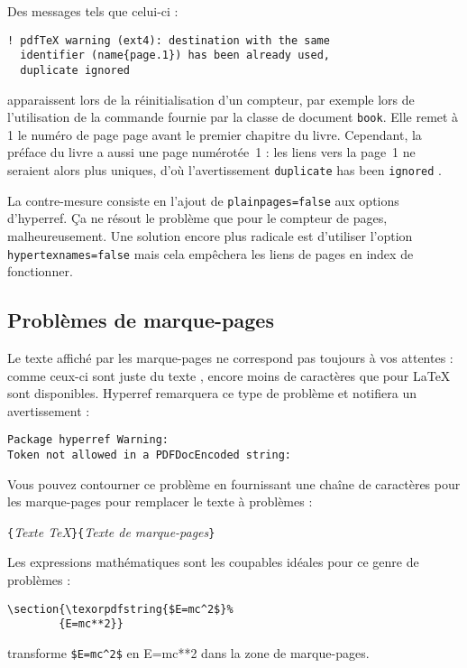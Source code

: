 Des messages tels que celui-ci :
\begin{verbatim}
! pdfTeX warning (ext4): destination with the same
  identifier (name{page.1}) has been already used,
  duplicate ignored
\end{verbatim}
apparaissent lors de la réinitialisation d'un compteur, par exemple
lors de l'utilisation de la commande  fournie par la
classe de document \texttt{book}. Elle remet à 1 le numéro de page
page avant le premier chapitre du livre. Cependant, la préface du
livre a aussi une page numérotée~1 : les liens vers la \og page~1
\fg{} ne seraient alors plus uniques, d'où l'avertissement \og
\verb+duplicate+ has been \verb+ignored+ \fg{}.

La contre-mesure consiste en l'ajout de \texttt{plainpages=false} aux
options d'hyperref. Ça ne résout le problème que pour le compteur de
pages, malheureusement.
Une solution encore plus radicale est d'utiliser l'option\\
\texttt{hypertexnames=false} mais cela empêchera les liens de pages en
index de fonctionner.

\subsection{Problèmes de marque-pages}

Le texte affiché par les marque-pages ne correspond pas toujours à vos
attentes : comme ceux-ci sont \og juste du texte \fg{}, encore moins de
caractères que pour \LaTeX{} sont disponibles. Hyperref remarquera ce
type de problème et notifiera un avertissement :
\begin{code}
\begin{verbatim}
Package hyperref Warning:
Token not allowed in a PDFDocEncoded string:
\end{verbatim}
\end{code}
Vous pouvez contourner ce problème en fournissant une chaîne de
caractères pour les marque-pages pour remplacer le texte à problèmes :
\begin{lscommand}
\verb|{|\emph{Texte \TeX{}}\verb|}{|\emph{Texte de marque-pages}\verb|}|
\end{lscommand}


Les expressions mathématiques sont les coupables idéales pour ce genre
de problèmes :
\begin{code}
\begin{verbatim}
\section{\texorpdfstring{$E=mc^2$}%
        {E=mc**2}}
\end{verbatim}
\end{code}
transforme \verb+$E=mc^2$+ en \og E=mc**2 \fg{} dans la zone de
marque-pages.


